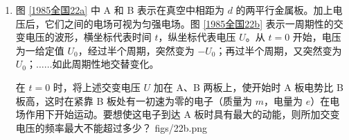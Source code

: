 \documentclass[\gkver]{gaokaozhenti}
\begin{document}
\begin{enumerate}
{电势能的增加量 $\Delta E_{p}=qEl\sin\varphi$（e）

所以得
$mgl(1-\cos\varphi)=qEl\sin\varphi$（f）

化简得
$\frac{1-\cos\varphi}{\sin\varphi}=\frac{qE}{mg}$，则 $\tan\frac{\varphi}{2}=\frac{qE}{mg}=\tan\alpha$，即 $\varphi=2\alpha$（g）

故细线与竖直方向的夹角为 $2\alpha$ 时，满足要求。

\onepicture[h=3.24cm]{}

评分标准：全题 12 分。（1）4 分，（2）8 分。（1）中，正确判断出电荷正负的，给 1 分；（a）、（b）两式列对一个的，给 1 分，两个都列对的，给 2 分；得出（c）式的，再给 1 分；没列（a）、（b）式直接写出（c）式的，也给 3 分。（2）中，正确列出重力势能的变化（或重力做功）即（d）式的，给 2 分；正确列出电势能的变化（或电场力做功）即（e）式的，给 2 分；列出（f）式的，给 3 分；得出最后结果（g）式的，再给 1 分。
}

\item
图 \ref{1985全国22a} 中 A 和 B 表示在真空中相距为 $d$ 的两平行金属板。加上电压后，它们之间的电场可视为匀强电场。图 \ref{1985全国22b} 表示一周期性的交变电压的波形，横坐标代表时间 $t$，纵坐标代表电压 $U$。从 $t=0$ 开始，电压为一给定值 $U_{0}$，经过半个周期，突然变为 $-U_{0}$；再过半个周期，又突然变为 $U_{0}$；$\ldots\ldots$如此周期性地交替变化。

在 $t=0$ 时，将上述交变电压 $U$ 加在 A、B 两板上，使开始时 A 板电势比 B 板高，这时在紧靠 B 板处有一初速为零的电子（质量为 $m$，电量为 $e$）在电场作用下开始运动。要想使这电子到达 A 板时具有最大的动能，则所加交变电压的频率最大不能超过多少？
{figs/22b.png}


\end{enumerate}
\end{document}
